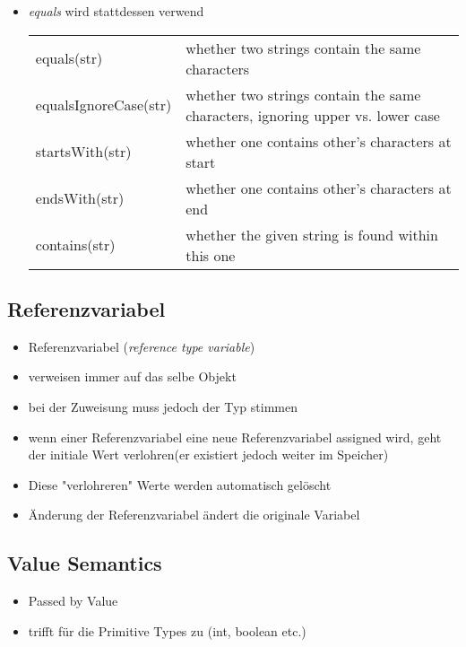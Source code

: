 \documentclass[11pt]{article}
\begin{document}
\begin{itemize}
\begin{itemize}
\item \emph{equals} wird stattdessen verwend\\
\begin{center}
\begin{tabular}{ll}
equals(str) & whether two strings contain the same characters\\
equalsIgnoreCase(str) & whether two strings contain the same characters, ignoring upper vs. lower case\\
startsWith(str) & whether one contains other's characters at start\\
endsWith(str) & whether one contains other's characters at end\\
contains(str) & whether the given string is found within this one\\
\end{tabular}
\end{center}
\end{itemize}
\end{itemize}

\subsection{Referenzvariabel}
\label{sec:orgd2ba881}
\begin{itemize}
\item Referenzvariabel (\emph{reference type variable})\\
\item verweisen immer auf das selbe Objekt\\
\item bei der Zuweisung muss jedoch der Typ stimmen\\
\item wenn einer Referenzvariabel eine neue Referenzvariabel assigned wird, geht der initiale Wert verlohren(er existiert jedoch weiter im Speicher)\\
\item Diese "verlohreren" Werte werden automatisch gelöscht\\
\item Änderung der Referenzvariabel ändert die originale Variabel\\
\end{itemize}

\subsection{Value Semantics}
\label{sec:org4eca990}
\begin{itemize}
\item Passed by Value\\
\item trifft für die Primitive Types zu (int, boolean etc.)\\
\end{itemize}
\end{document}
